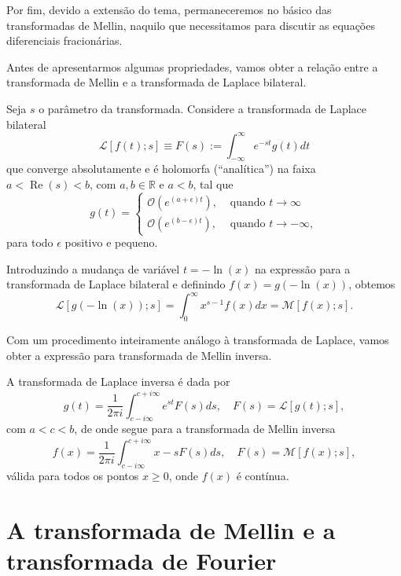Por fim, devido a extensão do tema, permaneceremos no básico das transformadas de Mellin, naquilo que necessitamos para discutir as equações diferenciais fracionárias.


Antes de apresentarmos algumas propriedades, vamos obter a relação entre a transformada de Mellin e a transformada de Laplace bilateral.

Seja $s$ o parâmetro da transformada. Considere a transformada de Laplace bilateral
$$\mathscr{L}[f(t); s] \equiv F(s) :=
\int_{-\infty}^{\infty}
e^{-st}g(t) dt$$
que converge absolutamente e é holomorfa (``analítica'') na faixa $a < \operatorname{Re}(s) < b$, com $a, b \in \mathbb{R}$ e $a < b$, tal que
$$g(t) =
\left\{\begin{array}{rl}
\mathscr{O}(e^{(a+\epsilon)t}),& \mbox{ quando } t \to \infty \\
\mathscr{O}(e^{(b-\epsilon)t}),& \mbox{ quando } t \to -\infty,
\end{array}\right.$$
para todo $\epsilon$ positivo e pequeno.

Introduzindo a mudança de variável $t = -\ln(x)$ na expressão para a transformada de Laplace bilateral e definindo
$f(x) = g(-\ln(x))$, obtemos
$$\mathscr{L}[g(-\ln(x)); s] =
\int_{0}^{\infty}
x^{s-1}f(x) dx = \mathscr{M}[f(x); s].$$

Com um procedimento inteiramente análogo à transformada de Laplace, vamos obter a expressão para transformada de Mellin inversa.

A transformada de Laplace inversa é dada por
$$g(t) =
\dfrac{1}{2\pi i}
\int_{c-i\infty}^{c+i\infty} 
e^{st} F(s) ds,\quad F(s) = \mathscr{L}[g(t); s],$$
com $a < c < b$, de onde segue para a transformada de Mellin inversa
$$f(x) =
\dfrac{1}{2\pi i}
\int_{c-i\infty}^{c+i\infty}
x-sF(s) ds,\quad F(s) = \mathscr{M}[f(x); s],$$
válida para todos os pontos $x \ge 0$, onde $f(x)$ é contínua.



\section{A transformada de Mellin e a transformada de Fourier}


